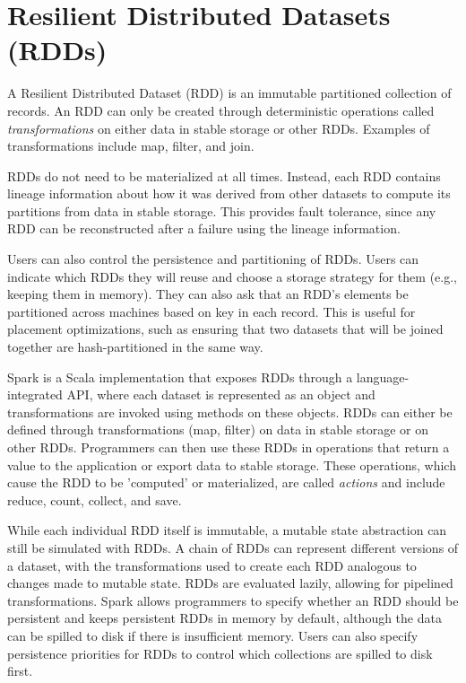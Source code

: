 
\section{Resilient Distributed Datasets (RDDs)}

A Resilient Distributed Dataset (RDD) is an immutable partitioned collection of records. An RDD can only be created through deterministic operations called \emph{transformations} on either data in stable storage or other RDDs. Examples of transformations include map, filter, and join.

RDDs do not need to be materialized at all times. Instead, each RDD contains lineage information about how it was derived from other datasets to compute its partitions from data in stable storage. This provides fault tolerance, since any RDD can be reconstructed after a failure using the lineage information. 

Users can also control the persistence and partitioning of RDDs. Users can indicate which RDDs they will reuse and choose a storage strategy for them (e.g., keeping them in memory). They can also ask that an RDD's elements be partitioned across machines based on key in each record. This is useful for placement optimizations, such as ensuring that two datasets that will be joined together are hash-partitioned in the same way.

Spark is a Scala implementation that exposes RDDs through a language-integrated API, where each dataset is represented as an object and transformations are invoked using methods on these objects. RDDs can either be defined through transformations (\eg map, filter) on data in stable storage or on other RDDs. Programmers can then use these RDDs in operations that return a value to the application or export data to stable storage. These operations, which cause the RDD to be 'computed' or materialized, are called \emph{actions} and include reduce, count, collect, and save. 

While each individual RDD itself is immutable, a mutable state abstraction can still be simulated with RDDs. A chain of RDDs can represent different versions of a dataset, with the transformations used to create each RDD analogous to changes made to mutable state. RDDs are evaluated lazily, allowing for pipelined transformations. Spark allows programmers to specify whether an RDD should be persistent and keeps persistent RDDs in memory by default, although the data can be spilled to disk if there is insufficient memory. Users can also specify persistence priorities for RDDs to control which collections are spilled to disk first.